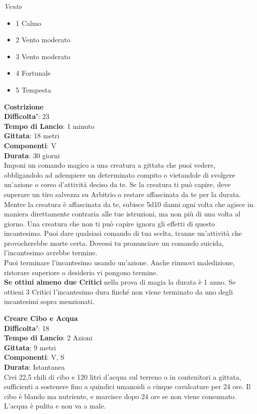 \begin{multicols}{2}
\textit{Vento}
\begin{itemize}
	\item 
1 Calmo
	\item 
2 Vento moderato
	\item 
3 Vento moderato
	\item 
4 Fortunale
	\item 
5 Tempesta
\end{itemize}

\medskip\textbf{Costrizione}\\
\textbf{Difficolta'}: 23\\
\textbf{Tempo di Lancio}: 1 minuto\\
\textbf{Gittata}: 18 metri\\
\textbf{Componenti}: V\\
\textbf{Durata}: 30 giorni\\
Imponi un comando magico a una creatura a gittata che puoi vedere, obbligandolo ad adempiere un determinato compito o vietandole di svolgere un’azione o corso d’attività deciso da te. Se la creatura ti può capire, deve superare un tiro salvezza su Arbitrio o restare affascinata da te per la durata. Mentre la creatura è affascinata da te, subisce 5d10 danni ogni volta che agisce in maniera direttamente contraria alle tue istruzioni, ma non più di una volta al giorno. Una creatura che non ti può capire ignora gli effetti di questo incantesimo. Puoi dare qualsiasi comando di tua scelta, tranne un’attività che provocherebbe morte certa. Dovessi tu pronunciare un comando suicida, l’incantesimo avrebbe termine.\\
Puoi terminare l’incantesimo usando un’azione. Anche rimuovi maledizione, ristorare superiore o desiderio vi pongono termine.\\
\textbf{Se ottini almeno due Critici} nella prova di magia la durata è 1 anno. Se ottieni 3 Critici l’incantesimo dura finché non viene terminato da uno degli incantesimi sopra menzionati.

\medskip\textbf{Creare Cibo e Acqua}\\
\textbf{Difficolta'}: 18\\
\textbf{Tempo di Lancio}: 2 Azioni\\
\textbf{Gittata}: 9 metri\\
\textbf{Componenti}: V, S\\
\textbf{Durata}: Istantanea\\
Crei 22,5 chili di cibo e 120 litri d’acqua sul terreno o in contenitori a gittata, sufficienti a sostenere fino a quindici umanoidi o cinque cavalcature per 24 ore. Il cibo è blando ma nutriente, e marcisce dopo 24 ore se non viene consumato. L’acqua è pulita e non va a male. 


\end{multicols}
